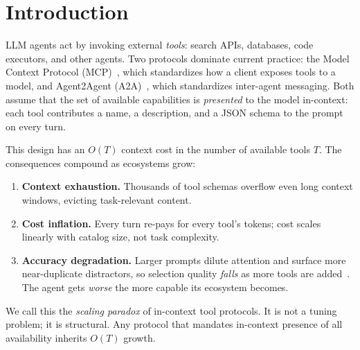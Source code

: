 \documentclass[11pt]{article}
\theoremstyle{plain}
\theoremstyle{definition}
\begin{document}
\section{Introduction}
LLM agents act by invoking external \emph{tools}: search APIs, databases, code
executors, and other agents. Two protocols dominate current practice: the Model
Context Protocol (MCP)~\citep{mcp2024}, which standardizes how a client exposes
tools to a model, and Agent2Agent (A2A)~\citep{a2a2024}, which standardizes
inter-agent messaging. Both assume that the set of available capabilities is
\emph{presented} to the model in-context: each tool contributes a name, a
description, and a JSON schema to the prompt on every turn.

This design has an $O(T)$ context cost in the number of available tools $T$.
The consequences compound as ecosystems grow:
\begin{enumerate}
  \item \textbf{Context exhaustion.} Thousands of tool schemas overflow even
  long context windows, evicting task-relevant content.
  \item \textbf{Cost inflation.} Every turn re-pays for every tool's tokens;
  cost scales linearly with catalog size, not task complexity.
  \item \textbf{Accuracy degradation.} Larger prompts dilute attention and
  surface more near-duplicate distractors, so selection quality \emph{falls} as
  more tools are added~\citep{liu2024lostmiddle}. The agent gets \emph{worse}
  the more capable its ecosystem becomes.
\end{enumerate}

We call this the \emph{scaling paradox} of in-context tool protocols. It is not
a tuning problem; it is structural. Any protocol that mandates in-context
presence of all availability inherits $O(T)$ growth.
\end{document}

